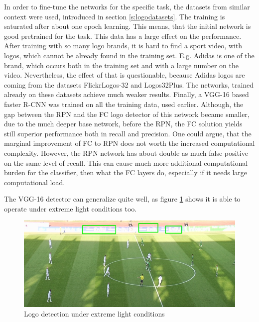 In order to fine-tune the networks for the specific task, the datasets from similar context were used, introduced in section \ref{s:logodatasets}. The training is saturated after about one epoch learning. This means, that the initial network is good pretrained for the task. This data has a large effect on the performance.
\bigbreak
After training with so many logo brands, it is hard to find a sport video, with logos, which cannot be already found in the training set. E.g. Adidas is one of the brand, which occurs both in the training set and with a large number on the video. Nevertheless, the effect of that is questionable, because Adidas logos are coming from the datasets FlickrLogos-32 and Logos32Plus. The networks, trained already on these datasets achieve much weaker results.
\bigbreak
Finally, a VGG-16 based faster R-CNN was trained on all the training data, used earlier. Although, the gap between the RPN and the FC logo detector of this network became smaller, due to the much deeper base network, before the RPN, the FC solution yields still superior performance both in recall and precision. One could argue, that the marginal improvement of FC to RPN does not worth the increased computational complexity. However, the RPN network has about double as much false positive on the same level of recall. This can cause much more additional computational burden for the classifier, then what the FC layers do, especially if it needs large computational load.

The VGG-16 detector can generalize quite well, as figure \ref{f:extreme} shows it is able to operate under extreme light conditions too.

\begin{figure}
  \centering
  \includegraphics[width=120mm]{images/mt/extreme.png}
  \caption{Logo detection under extreme light conditions}
  \label{f:extreme}
\end{figure}

